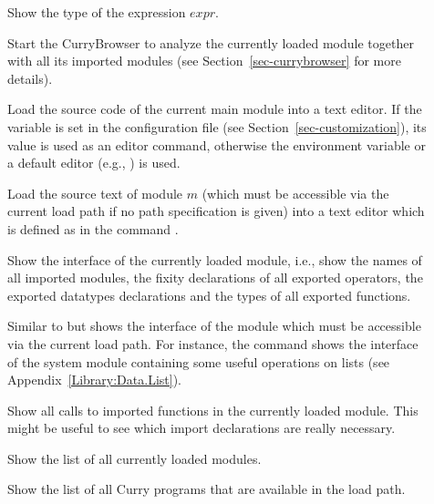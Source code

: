 \begin{description}
\item[]
Show the type of the expression $expr$.

\item[]
Start the CurryBrowser to analyze the currently loaded
module together with all its imported modules
(see Section~\ref{sec-currybrowser} for more details).

\item[]
Load the source code of the current main module into a text editor.
If the variable  is set in the
configuration file 
(see Section~\ref{sec-customization}),
its value is used as an editor command, otherwise
the environment variable 
or a default editor (e.g., ) is used.

\item[]
Load the source text of module $m$ (which must be accessible
via the current load path if no path specification is given)
into a text editor which is defined
as in the command .

\item[]
Show the interface of the currently loaded
module, i.e., show the names of all imported modules,
the fixity declarations of all exported operators,
the exported datatypes declarations and the types
of all exported functions.

\item[]
Similar to 
but shows the interface of the module 
which must be accessible via the current load path.
For instance, the command  shows the interface
of the system module  containing some useful
operations on lists
(see Appendix~\ref{Library:Data.List}).

\item[]
Show all calls to imported functions in the currently loaded module.
This might be useful to see which import declarations are really necessary.

\item[]
Show the list of all currently loaded modules.

\item[]
Show the list of all Curry programs that are available in the load path.


\end{description}
